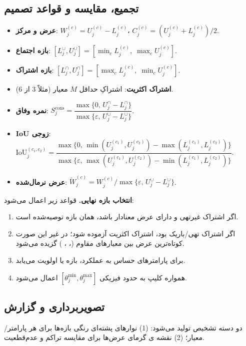 \subsection{تجمیع، مقایسه و قواعد تصمیم}
\begin{itemize}
    \item \textbf{عرض و مرکز}: $W^{(c)}_j=U^{(c)}_j-L^{(c)}_j$، $C^{(c)}_j=(U^{(c)}_j+L^{(c)}_j)/2$.
    \item \textbf{بازه اجتماع}: $[L^{\cup}_j, U^{\cup}_j]=[\min_c L^{(c)}_j,\; \max_c U^{(c)}_j]$.
    \item \textbf{بازه اشتراک}: $[L^{\cap}_j, U^{\cap}_j]=[\max_c L^{(c)}_j,\; \min_c U^{(c)}_j]$.
    \item \textbf{اشتراک اکثریت}: اشتراکِ حداقل $M$ معیار (مثلاً 3 از 6).
    \item \textbf{نمره وفاق}: $S^{\text{cons}}_j = \dfrac{\max\{0,\,U^{\cap}_j-L^{\cap}_j\}}{\max\{\varepsilon,\,U^{\cup}_j-L^{\cup}_j\}}$.
    \item \textbf{IoU زوجی}: $\mathrm{IoU}^{(c_1,c_2)}_j = \dfrac{\max\{\!0,\,\min(U^{(c_1)}_j,U^{(c_2)}_j)-\max(L^{(c_1)}_j,L^{(c_2)}_j)\}}{\max\{\varepsilon,\,\max(U^{(c_1)}_j,U^{(c_2)}_j)-\min(L^{(c_1)}_j,L^{(c_2)}_j)\}}$.
    \item \textbf{عرض نرمال‌شده}: $\tilde W^{(c)}_j = W^{(c)}_j/\max\{\varepsilon,\,U^{\cup}_j-L^{\cup}_j\}$.
\end{itemize}
\noindent\textbf{انتخاب بازه نهایی.} قواعد زیر اعمال می‌شود:
\begin{enumerate}[label=\textbf{R\arabic*}]
    \item اگر اشتراک غیرتهی و دارای عرض معنادار باشد، همان بازه توصیه‌شده است.
    \item اگر اشتراک تهی/باریک بود، اشتراک اکثریت آزموده شود؛ در غیر این صورت کوتاه‌ترین عرض بین معیارهای مقاوم (، ، ) گزیده می‌شود.
    \item برای پارامترهای حساس به عملکرد، بازه  یا  اولویت می‌یابد.
    \item همواره کلیپ به حدود فیزیکی $[\theta_j^{\min}, \theta_j^{\max}]$ اعمال می‌شود.
\end{enumerate}

\subsection{تصویربرداری و گزارش}
دو دسته تشخیص تولید می‌شود: (1) نوارهای پشته‌ای رنگی بازه‌ها برای هر پارامتر/معیار؛ (2) نقشه ی گرمای عرض‌ها برای مقایسه تراکم و عدم‌قطعیت.

